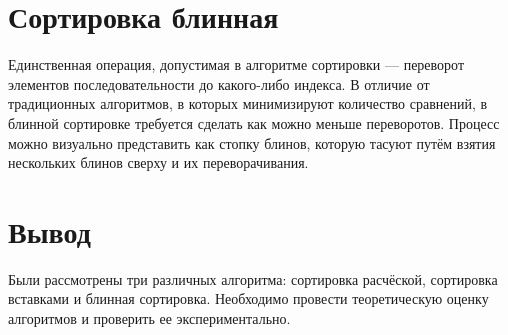 \section{Сортировка блинная}
Единственная операция, допустимая в алгоритме сортировки — переворот элементов последовательности до какого-либо индекса.
В отличие от традиционных алгоритмов, в которых минимизируют количество сравнений, в блинной сортировке требуется сделать как можно меньше переворотов.
Процесс можно визуально представить как стопку блинов, которую тасуют путём взятия нескольких блинов сверху и их переворачивания.

\section*{Вывод}
Были рассмотрены три различных алгоритма: сортировка расчёской, сортировка вставками и блинная сортировка.
Необходимо провести теоретическую оценку алгоритмов и проверить ее экспериментально.
